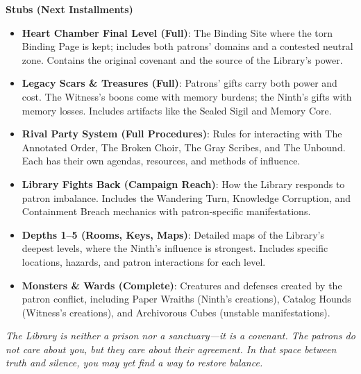 \documentclass[10pt,letterpaper]{article}
\newcommand{\sectionheader}[1]{\vspace{0.5em}\textbf{\large #1}\\[0.3em]}
\begin{document}
\sectionheader{Stubs (Next Installments)}
\begin{itemize}[leftmargin=*]
\item \textbf{Heart Chamber Final Level (Full)}: The Binding Site where the torn Binding Page is kept; includes both patrons' domains and a contested neutral zone. Contains the original covenant and the source of the Library's power.

\item \textbf{Legacy Scars \& Treasures (Full)}: Patrons' gifts carry both power and cost. The Witness's boons come with memory burdens; the Ninth's gifts with memory losses. Includes artifacts like the Sealed Sigil and Memory Core.

\item \textbf{Rival Party System (Full Procedures)}: Rules for interacting with The Annotated Order, The Broken Choir, The Gray Scribes, and The Unbound. Each has their own agendas, resources, and methods of influence.

\item \textbf{Library Fights Back (Campaign Reach)}: How the Library responds to patron imbalance. Includes the Wandering Turn, Knowledge Corruption, and Containment Breach mechanics with patron-specific manifestations.

\item \textbf{Depths 1--5 (Rooms, Keys, Maps)}: Detailed maps of the Library's deepest levels, where the Ninth's influence is strongest. Includes specific locations, hazards, and patron interactions for each level.

\item \textbf{Monsters \& Wards (Complete)}: Creatures and defenses created by the patron conflict, including Paper Wraiths (Ninth's creations), Catalog Hounds (Witness's creations), and Archivorous Cubes (unstable manifestations).
\end{itemize}

\begin{center}
\textit{The Library is neither a prison nor a sanctuary---it is a covenant. The patrons do not care about you, but they care about their agreement. In that space between truth and silence, you may yet find a way to restore balance.}
\end{center}


\end{document}
